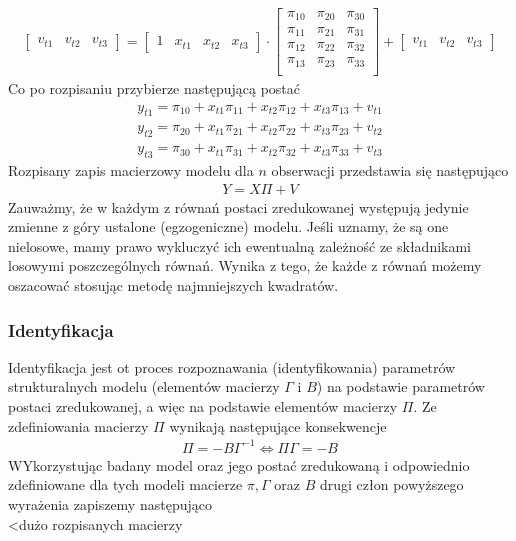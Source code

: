\begin{gather*}
\begin{bmatrix}
v_{t1}&v_{t2}&v_{t3}
\end{bmatrix}
=
\begin{bmatrix}
1&x_{t1}&x_{t2}&x_{t3}
\end{bmatrix}
\cdot
\begin{bmatrix}
\pi _{10} & \pi _{20} & \pi _{30} \\
\pi _{11} & \pi _{21} & \pi _{31} \\
\pi _{12} & \pi _{22} & \pi _{32} \\
\pi _{13} & \pi _{23} & \pi _{33} \\
\end{bmatrix}
+
\begin{bmatrix}
v_{t1}&v_{t2}&v_{t3}
\end{bmatrix}
\end{gather*}
Co po rozpisaniu przybierze następującą postać
\begin{gather*}
y_{t1}=\pi _{10}+x_{t1} \pi _{11}+x_{t2} \pi _{12}+x_{t3} \pi _{13} + v_{t1}\\
y_{t2}=\pi _{20}+x_{t1} \pi _{21}+x_{t2} \pi _{22}+x_{t3} \pi _{23} + v_{t2}\\
y_{t3}=\pi _{30}+x_{t1} \pi _{31}+x_{t2} \pi _{32}+x_{t3} \pi _{33} + v_{t3}
\end{gather*}
Rozpisany zapis macierzowy modelu dla $ n $ obserwacji przedstawia się następująco
\begin{gather*}
Y=X\Pi+V
\end{gather*}
Zauważmy, że w każdym z równań postaci zredukowanej występują jedynie zmienne z góry ustalone (egzogeniczne) modelu. Jeśli uznamy, że są one nielosowe, mamy prawo wykluczyć ich ewentualną zależność ze składnikami losowymi poszczególnych równań. Wynika z tego, że każde z równań możemy oszacować stosując metodę najmniejszych kwadratów.

\subsubsection{Identyfikacja}
Identyfikacja jest ot proces rozpoznawania (identyfikowania) parametrów strukturalnych modelu (elementów macierzy $ \Gamma $ i $ B $)  na podstawie parametrów postaci zredukowanej, a więc na podstawie elementów macierzy $ \Pi $. Ze zdefiniowania macierzy $ \Pi $ wynikają następujące konsekwencje
\begin{gather*}
\Pi=-B\Gamma^{-1}\Leftrightarrow\Pi\Gamma=-B
\end{gather*}WYkorzystując badany model oraz jego postać zredukowaną i odpowiednio zdefiniowane dla tych modeli macierze $ \pi,\Gamma $ oraz $ B $ drugi człon powyższego wyrażenia zapiszemy następująco\\
<dużo rozpisanych macierzy

